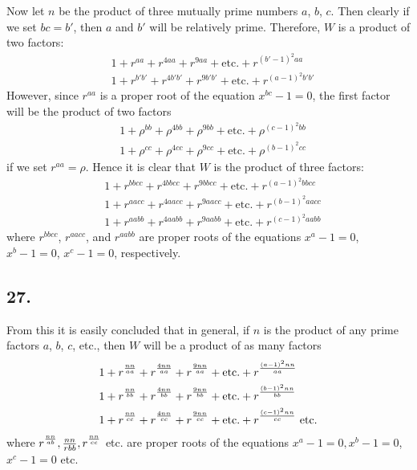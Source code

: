 \documentclass[twoside,12pt]{memoir}
\let\oldfrac\frac
\def\frac#1#2{\mathchoice{\tfrac{#1}{#2}}{\oldfrac{#1}{#2}}{\genfrac{}{}{}{2}{#1}{#2\mathstrut}}{\genfrac{}{}{}{3}{#1}{#2\mathstrut}}}
\begin{document}
Now let \(n\) be the product of three mutually prime numbers \(a\), \(b\), \(c\).  Then clearly if we set \(bc = b'\), then \(a\) and \(b'\) will be relatively prime.  Therefore, \(W\) is a product of two factors:
\[\begin{aligned}
& 1+r^{aa}+r^{4aa}+r^{9aa}+\text{etc{.}}+r^{(b'-1)^2aa} \\
& 1+r^{b'b'}+r^{4b'b'}+r^{9b'b'}+\text{etc{.}}+r^{(a-1)^2b'b'}
\end{aligned}\]
However, since \(r^{aa}\) is a proper root of the equation \(x^{bc} - 1 = 0\), the first factor will be the product of two factors
\[\begin{aligned}
& 1+\rho^{bb}+\rho^{4bb}+\rho^{9bb}+\text{etc{.}}+\rho^{(c-1)^2bb} \\
& 1+\rho^{cc}+\rho^{4cc}+\rho^{9cc}+\text{etc{.}}+\rho^{(b-1)^2cc}
\end{aligned}\]
if we set \(r^{aa} = \rho\). Hence it is clear that \(W\) is the product of three factors:
\[\begin{aligned}
& 1+r^{bbcc}+r^{4bbcc}+r^{9bbcc}+\text{etc{.}}+r^{(a-1)^2bbcc} \\
& 1+r^{aacc}+r^{4aacc}+r^{9aacc}+\text{etc{.}}+r^{(b-1)^2aacc} \\
& 1+r^{aabb}+r^{4aabb}+r^{9aabb}+\text{etc{.}}+r^{(c-1)^2aabb}
\end{aligned}\]
where \(r^{bbcc}\), \(r^{aacc}\), and \(r^{aabb}\) are proper roots of the equations \(x^a - 1 = 0\), \(x^b - 1 = 0\), \(x^c - 1 = 0\), respectively.

\subsection*{27.}

From this it is easily concluded that in general, if \(n\) is the product of any prime factors \(a\), \(b\), \(c\), etc{.}, then \(W\) will be a product of as many factors
\[\begin{aligned}
& 1+r^{\frac{n n}{a a}}+r^{\frac{4 n n}{a a}}+r^{\frac{9 n n}{a a}}+\text{etc{.}}+r^{\frac{(a-1)^{2} n n}{a a}} \\
& 1+r^{\frac{n n}{b b}}+r^{\frac{4 n n}{b b}}+r^{\frac{9 n n}{b b}}+\text{etc{.}}+r^{\frac{(b-1)^{2} n n}{b b}} \\
& 1+r^{\frac{n n}{c c}}+r^{\frac{4 n n}{c c}}+r^{\frac{9 n n}{c c}}+\text{etc{.}}+r^{\frac{(c-1)^{2} n n}{c c}} \text{ etc{.}}
\end{aligned}\]
where \(r^{\frac{n n}{a b}}, \frac{n n}{r b b}, r^{\frac{n n}{c c}}\) etc{.} are proper roots of the equations \(x^{a}-1=0, x^{b}-1=0\), \(x^{c}-1=0\) etc{.}
\end{document}
